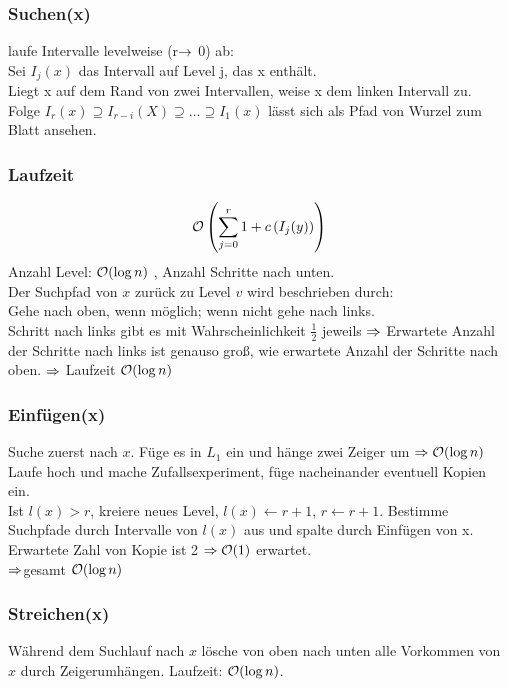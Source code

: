 	   \subsubsection{Suchen(x)}
	   	  laufe Intervalle levelweise (r$\rightarrow$ 0) ab:\\
	   	  Sei $I_j(x)$ das Intervall auf Level j, das x enthält.\\
	   	  Liegt x auf dem Rand von zwei Intervallen, weise x dem linken Intervall zu.\\
	   	  Folge $I_r(x)\supseteq I_{r-i}(X)\supseteq\dots\supseteq I_1(x)$ lässt sich als Pfad von Wurzel zum Blatt ansehen.

        \subsubsection{Laufzeit}
        	    $$
        	        \mathcal{O}\left(\sum\limits_{j=0}^r 1 + c\left(I_j(y)\right)\right)
        	    $$
            Anzahl Level: $\mathcal{O}(\log n)$ , Anzahl Schritte nach unten. \\
            Der Suchpfad von $x$ zurück zu Level $v$ wird beschrieben durch: \\
            Gehe nach oben, wenn möglich; wenn nicht gehe nach links. \\
            Schritt nach links gibt es mit Wahrscheinlichkeit $\frac{1}{2}$ jeweils $\Ra$ Erwartete Anzahl der Schritte nach links ist
            genauso groß, wie erwartete Anzahl der Schritte nach oben. $\Ra$ Laufzeit $\mathcal{O}(\log n)$ 
        
        \subsubsection{Einfügen(x)}
            Suche zuerst nach $x$. Füge es in $L_1$ ein und hänge zwei Zeiger um $\Ra \LO(\log n)$\\
            Laufe hoch und mache Zufallsexperiment, füge nacheinander eventuell Kopien ein.\\
            Ist $l(x)>r$, kreiere neues Level, $l(x)\gets r+1$, $r\gets r+1$. 
            Bestimme Suchpfade durch Intervalle von $l(x)$ aus und spalte durch Einfügen von x.
            Erwartete Zahl von Kopie ist 2 $\Ra \LO(1)$ erwartet. \\
            $\Ra $gesamt $ \mathcal{O}(\log n)$
        
        \subsubsection{Streichen(x)}
            Während dem Suchlauf nach $x$ lösche von oben nach unten alle Vorkommen von $x$ durch Zeigerumhängen. Laufzeit: $\mathcal{O}(\log n)$.\\
            
